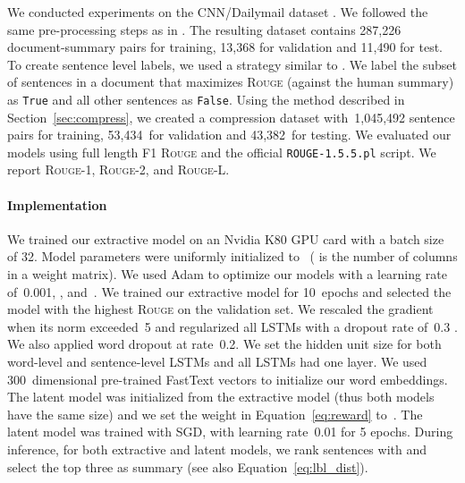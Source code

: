 \documentclass[11pt,a4paper]{article}
\begin{document}
We conducted experiments on the CNN/Dailymail dataset
\cite{hermann:2015:nips,see:2017:acl}. We followed the same
pre-processing steps as in . The resulting
dataset contains 287,226 document-summary pairs for training, 13,368
for validation and 11,490 for test. To create sentence level labels,
we used a strategy similar to . We label
the subset of sentences in a document that maximizes \textsc{Rouge}
(against the human summary) as {\tt True} and all other sentences as
{\tt False}. Using the method described in Section~\ref{sec:compress},
we created a compression dataset with~1,045,492 sentence pairs for
training, 53,434~for validation and 43,382~for testing.
We evaluated our models using full length F1 \textsc{Rouge}
\cite{lin:2004:acl:w} and the official {\tt ROUGE-1.5.5.pl} script. We
report \textsc{Rouge-1}, \textsc{Rouge-2}, and \textsc{Rouge-L}.

\paragraph{Implementation}
We trained our extractive model on an Nvidia K80 GPU card with a batch
size of 32. Model parameters were uniformly initialized
to~ ( is the number of
columns in a weight matrix).  We used Adam \cite{kingma:2014:arxiv} to
optimize our models with a learning rate of~0.001, ,
and~.
We trained our extractive model for 10~epochs and selected the model
with the highest \textsc{Rouge} on the validation set. We rescaled the
gradient when its norm exceeded~5 \cite{pascanu:2013:icml} and
regularized all LSTMs with a dropout rate of~0.3
\cite{srivastava:2014:jmlr,zaremba:2014:arxiv}.  We also applied word
dropout \cite{iyyer:2015:acl} at rate~0.2. We set the hidden unit size
 for both word-level and sentence-level LSTMs and all LSTMs had
one layer. We used 300~dimensional pre-trained FastText vectors
\cite{joulin:2017:eacl} to initialize our word embeddings. The latent
model was initialized from the extractive model (thus both models have
the same size) and we set the weight in Equation~\eqref{eq:reward}
to~. The latent model was trained with SGD, with learning
rate~0.01 for 5 epochs. During inference, for both extractive and
latent models, we rank sentences with  and select the top three as summary (see also
Equation~\eqref{eq:lbl_dist}).
\end{document}
